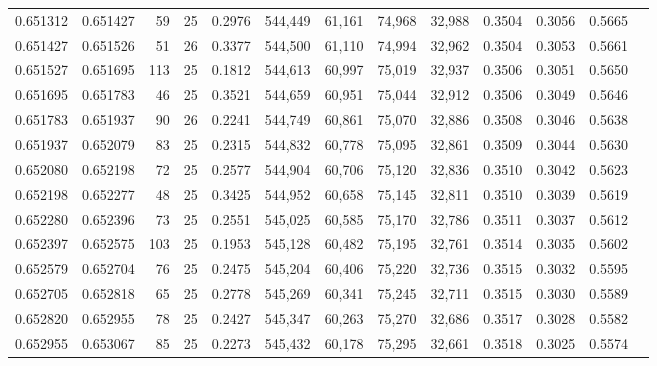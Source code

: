 \begin{tabular}{rrrrrrrrrrrrr}
0.651312 & 0.651427 &    59 &  25 &                                     0.2976 & 544,449 &  61,161 &  74,968 &  32,988 & 0.3504 & 0.3056 & 0.5665 \\
0.651427 & 0.651526 &    51 &  26 &                                     0.3377 & 544,500 &  61,110 &  74,994 &  32,962 & 0.3504 & 0.3053 & 0.5661 \\
0.651527 & 0.651695 &   113 &  25 &                                     0.1812 & 544,613 &  60,997 &  75,019 &  32,937 & 0.3506 & 0.3051 & 0.5650 \\
0.651695 & 0.651783 &    46 &  25 &                                     0.3521 & 544,659 &  60,951 &  75,044 &  32,912 & 0.3506 & 0.3049 & 0.5646 \\
0.651783 & 0.651937 &    90 &  26 &                                     0.2241 & 544,749 &  60,861 &  75,070 &  32,886 & 0.3508 & 0.3046 & 0.5638 \\
0.651937 & 0.652079 &    83 &  25 &                                     0.2315 & 544,832 &  60,778 &  75,095 &  32,861 & 0.3509 & 0.3044 & 0.5630 \\
0.652080 & 0.652198 &    72 &  25 &                                     0.2577 & 544,904 &  60,706 &  75,120 &  32,836 & 0.3510 & 0.3042 & 0.5623 \\
0.652198 & 0.652277 &    48 &  25 &                                     0.3425 & 544,952 &  60,658 &  75,145 &  32,811 & 0.3510 & 0.3039 & 0.5619 \\
0.652280 & 0.652396 &    73 &  25 &                                     0.2551 & 545,025 &  60,585 &  75,170 &  32,786 & 0.3511 & 0.3037 & 0.5612 \\
0.652397 & 0.652575 &   103 &  25 &                                     0.1953 & 545,128 &  60,482 &  75,195 &  32,761 & 0.3514 & 0.3035 & 0.5602 \\
0.652579 & 0.652704 &    76 &  25 &                                     0.2475 & 545,204 &  60,406 &  75,220 &  32,736 & 0.3515 & 0.3032 & 0.5595 \\
0.652705 & 0.652818 &    65 &  25 &                                     0.2778 & 545,269 &  60,341 &  75,245 &  32,711 & 0.3515 & 0.3030 & 0.5589 \\
0.652820 & 0.652955 &    78 &  25 &                                     0.2427 & 545,347 &  60,263 &  75,270 &  32,686 & 0.3517 & 0.3028 & 0.5582 \\
0.652955 & 0.653067 &    85 &  25 &                                     0.2273 & 545,432 &  60,178 &  75,295 &  32,661 & 0.3518 & 0.3025 & 0.5574 \\

\end{tabular}
